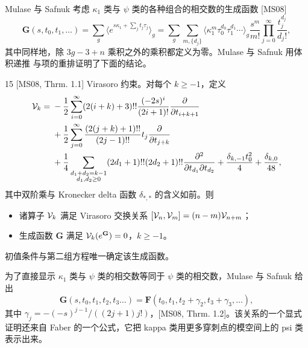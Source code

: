 Mulase 与 Safnuk 考虑 $\kappa_1$ 类与 $\psi$ 类的各种组合的相交数的生成函数 [MS08]
\[
\mathbf G(s,t_0,t_1,\dots)
=\sum_g\big\langle e^{s\kappa_1+\sum_j t_j\tau_j}\big\rangle_g
=\sum_g\sum_{m,\{d_j\}}\langle\kappa_1^m\tau_0^{d_0}\tau_1^{d_1}\cdots\rangle_g
\frac{s^m}{m!}\prod_{j=0}^{\infty}\frac{t_j^{d_j}}{d_j!},
\]
其中同样地，除 $3g-3+n$ 乘积之外的乘积都定义为零。Mulase 与 Safnuk 用体积递推
与项的重排证明了下面的结论。

\begin{thm}{15}
[MS08, Thrm. 1.1] Virasoro 约束。对每个 $k\ge -1$，定义
\[
\begin{aligned}
\mathcal{V}_k={}&-\frac12\sum_{i=0}^{\infty}(2(i+k)+3)!!\frac{(-2s)^i}{(2i+1)!}
\frac{\partial}{\partial t_{i+k+1}}\\
&+\frac12\sum_{j=0}^{\infty}\frac{(2(j+k)+1)!!}{(2j-1)!!}t_j
\frac{\partial}{\partial t_{j+k}}\\
&+\frac14\sum_{\substack{d_1+d_2=k-1\\ d_1,d_2\ge 0}}
(2d_1+1)!!(2d_2+1)!!\frac{\partial^2}{\partial t_{d_1}\partial t_{d_2}}
+\frac{\delta_{k,-1}t_0^2}{4}+\frac{\delta_{k,0}}{48},
\end{aligned}
\]
其中双阶乘与 Kronecker delta 函数 $\delta_{*,*}$ 的含义如前。则
\begin{itemize}[leftmargin=1.6em,itemsep=2pt,topsep=2pt]
\item 诸算子 $\mathcal{V}_k$ 满足 Virasoro 交换关系 $[\mathcal{V}_n,\mathcal{V}_m]=(n-m)\mathcal{V}_{n+m}$；
\item 生成函数 $\mathbf G$ 满足 $\mathcal{V}_k(e^{\mathbf G})=0$，$k\ge -1$。
\end{itemize}
初值条件与第二组方程唯一确定该生成函数。
\end{thm}


为了直接显示 $\kappa_1$ 类与 $\psi$ 类的相交数等同于 $\psi$ 类的相交数，Mulase 与
Safnuk 给出
\[
\mathbf G(s,t_0,t_1,t_2,t_3\dots)
=\mathbf F(t_0,t_1,t_2+\gamma_2,t_3+\gamma_3,\dots),
\]
其中 $\gamma_j=-(-s)^{j-1}/((2j+1)j!)$，[MS08, Thrm. 1.2]。该关系的一个显式证明还来自
Faber 的一个公式，它把 kappa 类用更多穿刺点的模空间上的 psi 类表示出来。

